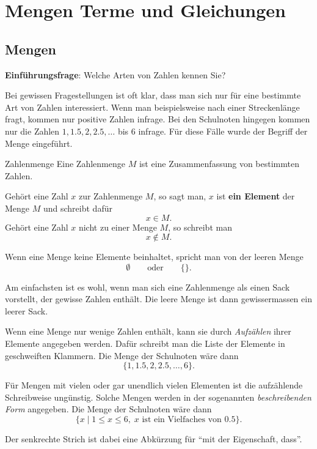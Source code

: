 \section{Mengen Terme und Gleichungen}
\subsection{Mengen}
\textbf{Einführungsfrage}: Welche Arten von Zahlen kennen Sie?

Bei gewissen Fragestellungen ist oft klar, dass man sich nur für eine bestimmte Art von Zahlen interessiert. Wenn man beispielsweise nach einer Streckenlänge fragt, kommen nur positive Zahlen infrage. Bei den Schulnoten hingegen kommen nur die Zahlen \(1, 1.5, 2, 2.5, \ldots\) bis \(6\) infrage. Für diese Fälle wurde der Begriff der Menge eingeführt.

\begin{definition}
    {Zahlenmenge}{}
    Eine Zahlenmenge \(M\) ist eine Zusammenfassung von bestimmten Zahlen.

    Gehört eine Zahl \(x\) zur Zahlenmenge \(M\), so sagt man, \(x\) ist \textbf{ein Element} der Menge \(M\) und schreibt dafür
    \[
        x \in M.
    \]
    Gehört eine Zahl \(x\) nicht zu einer Menge \(M\), so schreibt man
    \[
        x \notin M.
    \]

    Wenn eine Menge keine Elemente beinhaltet, spricht man von der leeren Menge
    \[
        \emptyset \qquad \text{oder} \qquad \{\}.
    \]

\end{definition}

Am einfachsten ist es wohl, wenn man sich eine Zahlenmenge als einen Sack vorstellt, der gewisse Zahlen enthält. Die leere Menge ist dann gewissermassen ein leerer Sack.

Wenn eine Menge nur wenige Zahlen enthält, kann sie durch \textit{Aufzählen} ihrer Elemente angegeben werden. Dafür schreibt man die Liste der Elemente in geschweiften Klammern. Die Menge der Schulnoten wäre dann
\[
    \{1, 1.5, 2, 2.5, \ldots, 6\}.
\]

Für Mengen mit vielen oder gar unendlich vielen Elementen ist die aufzählende Schreibweise ungünstig. Solche Mengen werden in der sogenannten \textit{beschreibenden Form} angegeben. Die Menge der Schulnoten wäre dann
\[
    \{x \mid 1 \leq x \leq 6,\; x \text{ ist ein Vielfaches von } 0.5\}.
\]

Der senkrechte Strich ist dabei eine Abkürzung für \enquote{mit der Eigenschaft, dass}.

\clearpage

\clearpage

\clearpage

\clearpage

\clearpage

\clearpage

\clearpage

\pagebreak

\clearpage
